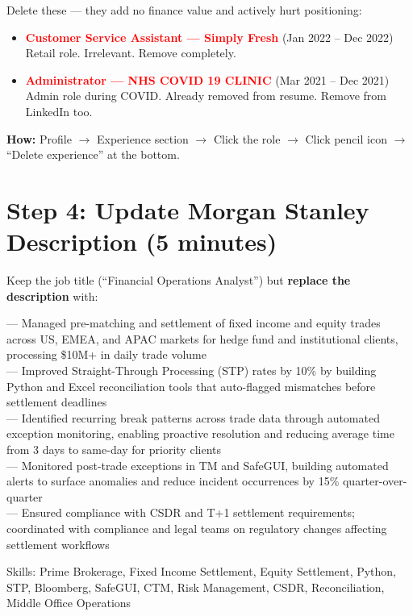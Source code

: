 \documentclass[11pt,a4paper]{article}
\begin{document}
Delete these --- they add no finance value and actively hurt positioning:

\begin{itemize}[leftmargin=1.2em]
    \item \textcolor{red}{\bfseries Customer Service Assistant --- Simply Fresh} (Jan 2022 -- Dec 2022)\\
    {\small Retail role. Irrelevant. Remove completely.}
    \item \textcolor{red}{\bfseries Administrator --- NHS COVID 19 CLINIC} (Mar 2021 -- Dec 2021)\\
    {\small Admin role during COVID. Already removed from resume. Remove from LinkedIn too.}
\end{itemize}

\textbf{How:} Profile $\rightarrow$ Experience section $\rightarrow$ Click the role $\rightarrow$ Click pencil icon $\rightarrow$ ``Delete experience'' at the bottom.

\section{Step 4: Update Morgan Stanley Description (5 minutes)}

Keep the job title (``Financial Operations Analyst'') but \textbf{replace the description} with:

\begin{copybox}
--- Managed pre-matching and settlement of fixed income and equity trades across US, EMEA, and APAC markets for hedge fund and institutional clients, processing \$10M+ in daily trade volume\\
--- Improved Straight-Through Processing (STP) rates by 10\% by building Python and Excel reconciliation tools that auto-flagged mismatches before settlement deadlines\\
--- Identified recurring break patterns across trade data through automated exception monitoring, enabling proactive resolution and reducing average time from 3 days to same-day for priority clients\\
--- Monitored post-trade exceptions in TM and SafeGUI, building automated alerts to surface anomalies and reduce incident occurrences by 15\% quarter-over-quarter\\
--- Ensured compliance with CSDR and T+1 settlement requirements; coordinated with compliance and legal teams on regulatory changes affecting settlement workflows

Skills: Prime Brokerage, Fixed Income Settlement, Equity Settlement, Python, STP, Bloomberg, SafeGUI, CTM, Risk Management, CSDR, Reconciliation, Middle Office Operations
\end{copybox}
\end{document}
